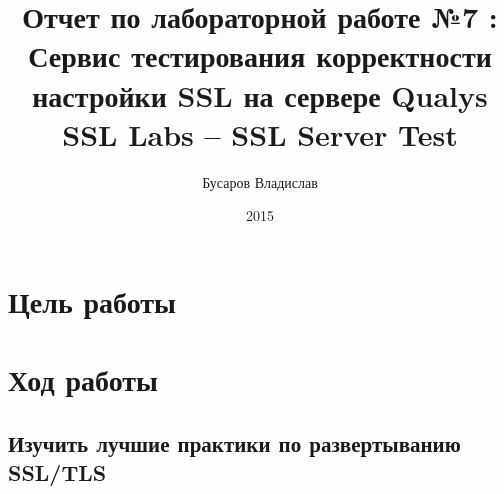 \documentclass[11pt, a4paper]{article}		%
\author{Бусаров Владислав}
\title{Отчет по лабораторной работе №7 :\\ Сервис тестирования корректности настройки SSL на сервере Qualys SSL Labs – SSL Server Test}
\date{2015}
\begin{document}
\maketitle
\tableofcontents
\newpage



\section{Цель работы}



\section{Ход работы}



\subsection{Изучить лучшие практики по развертыванию SSL/TLS}
\end{document}
